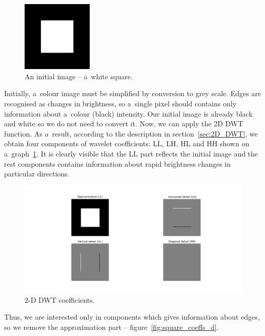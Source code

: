 \begin{figure}[h]
	\centering
	\includegraphics[width=0.3\textwidth]{graphs/square.png}
	\caption{An initial image -- a~white square.}
\end{figure}

Initially, a~colour image must be simplified by conversion to grey scale. Edges are recognised as changes in brightness, so a~single pixel should contains only information about a~colour (black) intensity. Our initial image is already black and white so we do not need to convert it. Now, we can apply the 2D DWT function. As a~result, according to the description in section~\ref{sec:2D_DWT}, we obtain four components of wavelet coefficients: LL, LH, HL and HH shown on a~graph~\ref{fig:square_coeffs}. It is clearly visible that the LL part reflects the initial image and the rest components contains information about rapid brightness changes in particular directions. 

\begin{figure}[h]
	\centering
	\includegraphics[width=\textwidth]{graphs/square_db2_coeffs.png}
	\caption{2-D DWT coefficients.}
	\label{fig:square_coeffs}
\end{figure}

Thus, we are interested only in components which gives information about edges, so we remove the approximation part -- figure~\ref{fig:square_coeffs_d}.

